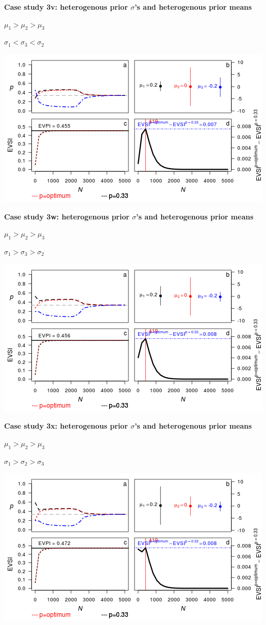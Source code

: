 \documentclass[]{article}
\theoremstyle{definition}
\theoremstyle{definition}
\theoremstyle{remark}
\begin{document}
\textbf{Case study 3v: heterogenous prior \(\sigma\)'s and heterogenous
prior means}

\(\mu_1 > \mu_2 > \mu_3\)

\(\sigma_1 < \sigma_3 < \sigma_2\)

\includegraphics{figure/x10n1_1___1__1c-1.png} \clearpage

\textbf{Case study 3w: heterogenous prior \(\sigma\)'s and heterogenous
prior means}

\(\mu_1 > \mu_2 > \mu_3\)

\(\sigma_1 > \sigma_3 > \sigma_2\)

\includegraphics{figure/x10n1__1___1_1c-1.png} \clearpage

\textbf{Case study 3x: heterogenous prior \(\sigma\)'s and heterogenous
prior means}

\(\mu_1 > \mu_2 > \mu_3\)

\(\sigma_1 > \sigma_2 > \sigma_3\)

\includegraphics{figure/x10n1___1__1_1c-1.png} \clearpage

\captionsetup{labelformat=default}
\end{document}
